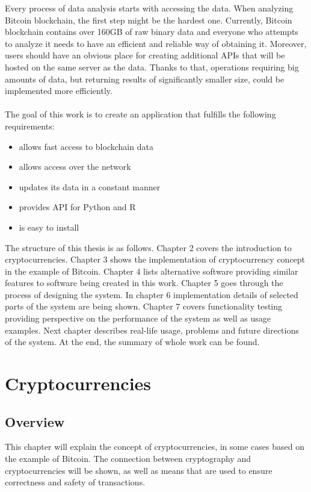 \documentclass[12pt, en, eng, twoside, final]{mgr}
\begin{document}
Every process of data analysis starts with accessing the data. When analyzing Bitcoin blockchain, the first step might be the hardest one. Currently, Bitcoin blockchain contains over 160GB of raw binary data and everyone who attempts to analyze it needs to have an efficient and reliable way of obtaining it. Moreover, users should have an obvious place for creating additional APIs that will be hosted on the same server as the data. Thanks to that, operations requiring big amounts of data, but returning results of significantly smaller size, could be implemented more efficiently.
\\
\\
The goal of this work is to create an application that fulfills the following requirements: 
\begin{itemize}

\item
allows fast access to blockchain data
\item
allows access over the network
\item
updates its data in a constant manner
\item
provides API for Python and R
\item
is easy to install

\end{itemize}

The structure of this thesis is as follows. Chapter 2 covers the introduction to cryptocurrencies. Chapter 3 shows the implementation of cryptocurrency concept in the example of Bitcoin. Chapter 4 lists alternative software providing similar features to software being created in this work. Chapter 5 goes through the process of designing the system. In chapter 6 implementation details of selected parts of the system are being shown. Chapter 7 covers functionality testing providing perspective on the performance of the system as well as usage examples. Next chapter describes real-life usage, problems and future directions of the system. At the end, the summary of whole work can be found. 

\chapter{Cryptocurrencies}

\section{Overview}
This chapter will explain the concept of cryptocurrencies, in some cases based on the example of Bitcoin. The connection between cryptography and cryptocurrencies will be shown, as well as means that are used to ensure correctness and safety of transactions.
\end{document}
